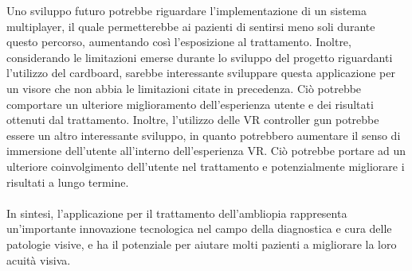 \documentclass[
a4paper,
cleardoublepage=empty,
headings=twolinechapter,
numbers=autoenddot,
]{scrbook}
\begin{document}
	Uno sviluppo futuro potrebbe riguardare l'implementazione di un sistema multiplayer, il quale permetterebbe ai pazienti di sentirsi meno soli durante questo percorso, aumentando così l'esposizione al trattamento. Inoltre, considerando le limitazioni emerse durante lo sviluppo del progetto riguardanti l'utilizzo del cardboard, sarebbe interessante sviluppare questa applicazione per un visore che non abbia le limitazioni citate in precedenza. Ciò potrebbe comportare un ulteriore miglioramento dell'esperienza utente e dei risultati ottenuti dal trattamento. Inoltre, l'utilizzo delle VR controller gun potrebbe essere un altro interessante sviluppo, in quanto potrebbero aumentare il senso di immersione dell'utente all'interno dell'esperienza VR. Ciò potrebbe portare ad un ulteriore coinvolgimento dell'utente nel trattamento e potenzialmente migliorare i risultati a lungo termine.\\\\
	
	In sintesi, l'applicazione per il trattamento dell'ambliopia rappresenta un'importante innovazione tecnologica nel campo della diagnostica e cura delle patologie visive, e ha il potenziale per aiutare molti pazienti a migliorare la loro acuità visiva.
	
    
	
		
\end{document}
